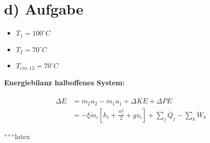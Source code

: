 \section*{d) Aufgabe}

\begin{itemize}
    \item $T_1 = 100^\circ C$
    \item $T_2 = 70^\circ C$
    \item $T_{ein,12} = 70^\circ C$
\end{itemize}

\textbf{Energiebilanz halboffenes System:}

\begin{align*}
    \Delta E &= \dot{m}_2 u_2 - \dot{m}_1 u_1 + \Delta \dot{KE} + \Delta \dot{PE} \\
    &= -\xi \dot{m}_i \left[ h_i + \frac{w_i^2}{2} + g z_i \right] + \sum_j \dot{Q}_j - \sum_k \dot{W}_k
\end{align*}

``````latex